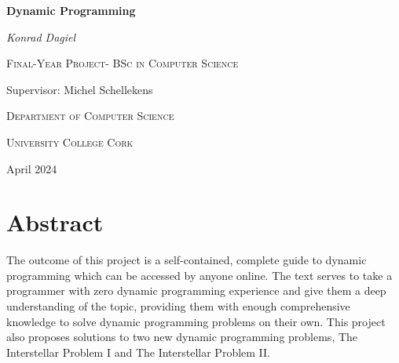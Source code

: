 \documentclass[12pt]{report}
\theoremstyle{definition}
\begin{document}
\begin{titlepage}
    \centering
    {\huge\bfseries Dynamic Programming\par}
    \vspace{2cm}
    {\Large\itshape Konrad Dagiel\par}
    \vspace{1cm}
    {\scshape\Large Final-Year Project- BSc in Computer Science \par}
    \vspace{1cm}
    {\Large Supervisor: Michel Schellekens \par}
    \vspace{1cm}
    {\scshape\Large Department of Computer Science \par}
    \vspace{1cm}
    {\scshape\LARGE University College Cork \par}
    \vspace{1.5cm}
    {\large April 2024\par}
\end{titlepage}

\chapter*{Abstract}
The outcome of this project is a self-contained, complete guide to dynamic programming which can 
be accessed by anyone online. The text serves to take a programmer with zero dynamic 
programming experience and give them a deep understanding of the topic, providing them with
enough comprehensive knowledge to solve dynamic programming problems on their own.
This project also proposes solutions to two new dynamic programming problems, The Interstellar Problem I and The Interstellar Problem II.
\end{document}
